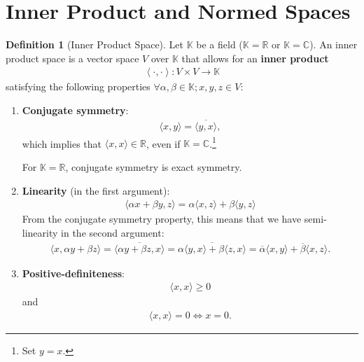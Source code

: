 \documentclass[12pt, a4paper]{article}
\numberwithin{equation}{section}
\theoremstyle{definition}
\theoremstyle{definition}
\newtheorem{defn}[thm]{Definition} %
\begin{document}
	\section{Inner Product and Normed Spaces}
	\begin{defn}[Inner Product Space]
		Let $\mathbb K$ be a field ($\mathbb K = \mathbb R$ or $\mathbb K = \mathbb C$). An inner product space is a vector space $V$ over $\mathbb K$ that allows for an \textbf{inner product} 
		\begin{align}
			\left\langle \bm{\cdot}, \bm{\cdot}\right\rangle: V\times V\rightarrow \mathbb K
		\end{align}
		satisfying the following properties $\forall \alpha, \beta\in \mathbb K; x, y, z\in V$:
		\begin{enumerate}
			\item \textbf{Conjugate symmetry}:
			\begin{align}
				\langle x, y\rangle = \overline{\langle y, x\rangle},
			\end{align}
			which implies that $\langle x, x\rangle\in \mathbb R$, even if $\mathbb K = \mathbb C$.\footnote{Set $y = x$.} 
			
			For $\mathbb K = \mathbb R$, conjugate symmetry is exact symmetry.
			
			\item \textbf{Linearity} (in the first argument): 
			\begin{align}
				\langle \alpha x + \beta y, z\rangle = \alpha\langle x, z\rangle + \beta\langle y, z\rangle
			\end{align}
			From the conjugate symmetry property, this means that we have semi-linearity in the second argument:
			\begin{align}
				\langle x, \alpha y + \beta z\rangle = \overline{\langle \alpha y + \beta z, x \rangle} = \overline{\alpha\langle y, x \rangle + \beta\langle z, x \rangle} = \overline{\alpha}\langle x, y\rangle + \overline{\beta}\langle x, z\rangle.
			\end{align}
		
			\item \textbf{Positive-definiteness}:
			\begin{align}
				\langle x, x\rangle \geq 0
			\end{align}
			and 
			\begin{align}
				\langle x, x\rangle = 0 \Leftrightarrow x = 0.
			\end{align}
		\end{enumerate}
	\end{defn}
\end{document}
